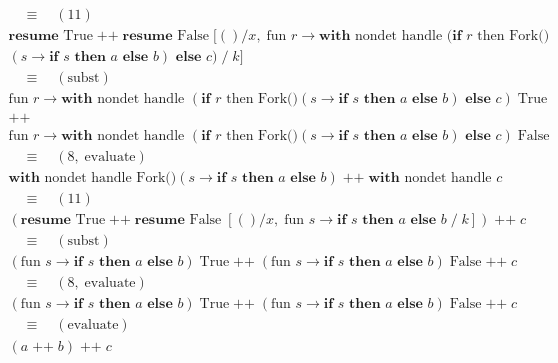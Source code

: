\documentclass[logo,bsc,singlespacing,parskip]{infthesis}
\begin{document}
\vspace{-1em}

\[
\begin{array}{l}
\quad \equiv \quad (11) \\[5pt]
\textbf{resume } \text{True} \;\texttt{++}\; \textbf{resume } \text{False} \; [()/x,\; \text{fun } r \rightarrow \textbf{with } \text{nondet handle } (\textbf{if } r \text{ then Fork()} \\(s \rightarrow \textbf{if } s \textbf{ then } a \textbf{ else } b) \textbf{ else } c) \;/\; k] \\[5pt]

\quad \equiv \quad (\text{subst}) \\[5pt]
\text{fun } r \rightarrow \textbf{with } \text{nondet handle } (\textbf{if } r \text{ then Fork()}(s \rightarrow \textbf{if } s \textbf{ then } a \textbf{ else } b) \textbf{ else } c) \;\text{True} \\
\texttt{++} \\
\text{fun } r \rightarrow \textbf{with } \text{nondet handle } (\textbf{if } r \text{ then Fork()}(s \rightarrow \textbf{if } s \textbf{ then } a \textbf{ else } b) \textbf{ else } c) \;\text{False} \\[5pt]

\quad \equiv \quad (8,\; \text{evaluate}) \\[5pt]
\textbf{with } \text{nondet handle } \text{Fork()}(s \rightarrow \textbf{if } s \textbf{ then } a \textbf{ else } b) \;\texttt{++}\; \textbf{with } \text{nondet handle } c \\[5pt]

\quad \equiv \quad (11) \\[5pt]
(\textbf{resume } \text{True} \;\texttt{++}\; \textbf{resume } \text{False} \; [()/x,\; \text{fun } s \rightarrow \textbf{if } s \textbf{ then } a \textbf{ else } b \;/\; k]) \;\texttt{++}\; c \\[5pt]

\quad \equiv \quad (\text{subst}) \\[5pt]
(\text{fun } s \rightarrow \textbf{if } s \textbf{ then } a \textbf{ else } b)\; \text{True} \;\texttt{++}\; (\text{fun } s \rightarrow \textbf{if } s \textbf{ then } a \textbf{ else } b)\; \text{False} \;\texttt{++}\; c \\[5pt]

\quad \equiv \quad (8,\; \text{evaluate}) \\[5pt] 
(\text{fun } s \rightarrow \textbf{if } s \textbf{ then } a \textbf{ else } b)\; \text{True} \;\texttt{++}\; (\text{fun } s \rightarrow \textbf{if } s \textbf{ then } a \textbf{ else } b)\; \text{False} \;\texttt{++}\; c \\[5pt]

\quad \equiv \quad (\text{evaluate}) \\[5pt]
(a \;\texttt{++}\; b) \;\texttt{++}\; c
\end{array}
\]
\end{document}
